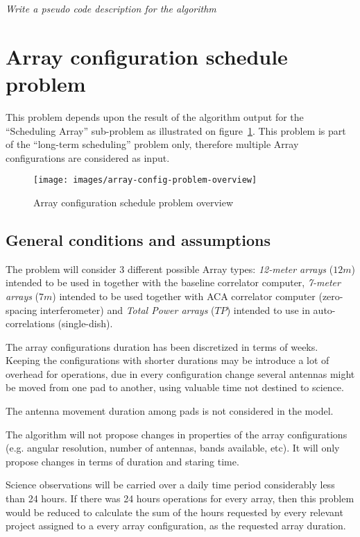 \textit{Write a pseudo code description for the algorithm}

\section{Array configuration schedule problem}
This problem depends upon the result of the algorithm output for the ``Scheduling Array'' sub-problem as illustrated on figure~\ref{fig:array-config-problem-overview}. This problem is part of the ``long-term scheduling'' problem only, therefore multiple Array configurations are considered as input.
\begin{figure}[h!]
\begin{center}
\texttt{[image: images/array-config-problem-overview]}
\caption{Array configuration schedule problem overview}
\end{center}
\label{fig:array-config-problem-overview}
\end{figure}

\subsection{General conditions and assumptions}
\label{sec:array-problem-general-condition}
The problem will consider 3 different possible Array types: \textit{12-meter arrays} ($12m$) intended to be used in together with the baseline correlator computer, \textit{7-meter arrays} ($7m$) intended to be used together with ACA correlator computer (zero-spacing interferometer) and \textit{Total Power arrays} ($TP$) intended to use in auto-correlations (single-dish). 

The array configurations duration has been discretized in terms of weeks. Keeping the configurations with shorter durations may be introduce a lot of overhead for operations, due in every configuration change several antennas might be moved from one pad to another, using valuable time not destined to science.

The antenna movement duration among pads is not considered in the model.

The algorithm will not propose changes in properties of the array configurations (e.g. angular resolution, number of antennas, bands available, etc). It will only propose changes in terms of duration and staring time.

Science observations will be carried over a daily time period considerably less than 24 hours. If there was 24 hours operations for every array, then this problem would be reduced to calculate the sum of the hours requested by every relevant project assigned to a every array configuration, as the requested array duration.

